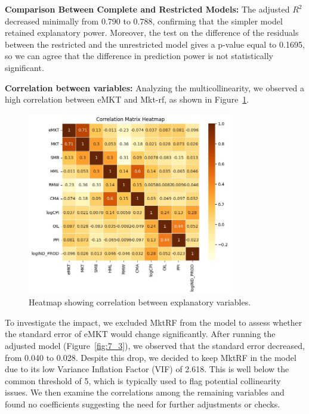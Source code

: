 \textbf{Comparison Between Complete and Restricted Models:} The adjusted $R^2$ decreased minimally from 0.790 to 0.788, confirming that the simpler 
model retained explanatory power. 
Moreover, the test on the difference of the residuals between the restricted and the unrestricted model gives a p-value 
equal to 0.1695, so we can agree that the difference in prediction power is not statistically significant.

\textbf{Correlation between variables:} Analyzing the multicollinearity, we observed a high correlation between eMKT and 
Mkt-rf, as shown in Figure~\ref{fig:correlation}. 

\begin{figure}[h!]
    \centering
    \includegraphics[width=0.8\textwidth]{images/correlation.jpeg}
    \caption{Heatmap showing correlation between explanatory variables.}\label{fig:correlation}
\end{figure}

To investigate the impact, we excluded MktRF from the model to assess whether the standard error of eMKT would change
significantly.
After running the adjusted model (Figure~\ref{fig:7_3}), we observed that the standard error decreased, from 0.040 to 0.028.
Despite this drop, we decided to keep MktRF in the model due to its low Variance Inflation Factor (VIF) of 2.618.
This is well below the common threshold of 5, which is typically used to flag potential collinearity issues.
We then examine the correlations among the remaining variables and found no coefficients suggesting the need for further
adjustments or checks.

